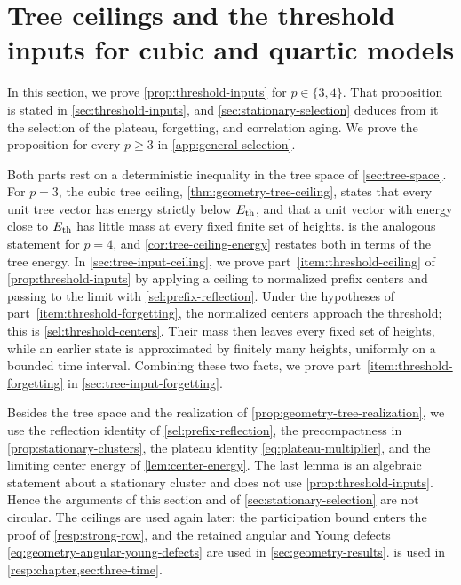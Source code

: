 \chapter{Tree ceilings and the threshold inputs for cubic and quartic models}\label{sec:tree-ceilings}

In this section, we prove \cref{prop:threshold-inputs} for $p\in\{3,4\}$. That proposition is stated in \cref{sec:threshold-inputs}, and \cref{sec:stationary-selection} deduces from it the selection of the plateau, forgetting, and correlation aging. We prove the proposition for every $p\ge3$ in \cref{app:general-selection}.

Both parts rest on a deterministic inequality in the tree space of \cref{sec:tree-space}. For $p=3$, the cubic tree ceiling, \cref{thm:geometry-tree-ceiling}, states that every unit tree vector has energy strictly below $E_{\mathrm{th}}$, and that a unit vector with energy close to $E_{\mathrm{th}}$ has little mass at every fixed finite set of heights.  is the analogous statement for $p=4$, and \cref{cor:tree-ceiling-energy} restates both in terms of the tree energy. In \cref{sec:tree-input-ceiling}, we prove part~\ref{item:threshold-ceiling} of \cref{prop:threshold-inputs} by applying a ceiling to normalized prefix centers and passing to the limit with \cref{sel:prefix-reflection}. Under the hypotheses of part~\ref{item:threshold-forgetting}, the normalized centers approach the threshold; this is \cref{sel:threshold-centers}. Their mass then leaves every fixed set of heights, while an earlier state is approximated by finitely many heights, uniformly on a bounded time interval. Combining these two facts, we prove part~\ref{item:threshold-forgetting} in \cref{sec:tree-input-forgetting}.

Besides the tree space and the realization of \cref{prop:geometry-tree-realization}, we use the reflection identity of \cref{sel:prefix-reflection}, the precompactness in \cref{prop:stationary-clusters}, the plateau identity \eqref{eq:plateau-multiplier}, and the limiting center energy of \cref{lem:center-energy}. The last lemma is an algebraic statement about a stationary cluster and does not use \cref{prop:threshold-inputs}. Hence the arguments of this section and of \cref{sec:stationary-selection} are not circular. The ceilings are used again later: the participation bound enters the proof of \cref{resp:strong-row}, and the retained angular and Young defects \eqref{eq:geometry-angular-young-defects} are used in \cref{sec:geometry-results}.  is used in \cref{resp:chapter,sec:three-time}.


